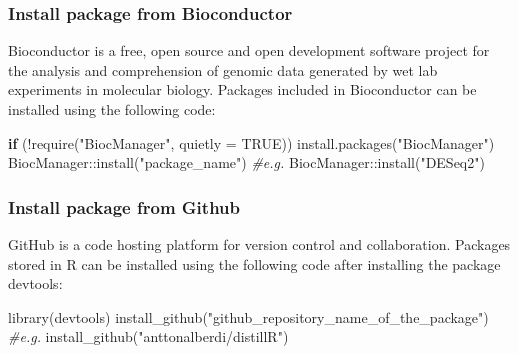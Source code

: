 \documentclass[
]{book}
\newenvironment{Shaded}{\begin{snugshade}}{\end{snugshade}}
\newcommand{\AttributeTok}[1]{\textcolor[rgb]{0.77,0.63,0.00}{#1}}
\newcommand{\CommentTok}[1]{\textcolor[rgb]{0.56,0.35,0.01}{\textit{#1}}}
\newcommand{\ConstantTok}[1]{\textcolor[rgb]{0.00,0.00,0.00}{#1}}
\newcommand{\ControlFlowTok}[1]{\textcolor[rgb]{0.13,0.29,0.53}{\textbf{#1}}}
\newcommand{\FunctionTok}[1]{\textcolor[rgb]{0.00,0.00,0.00}{#1}}
\newcommand{\NormalTok}[1]{#1}
\newcommand{\SpecialCharTok}[1]{\textcolor[rgb]{0.00,0.00,0.00}{#1}}
\newcommand{\StringTok}[1]{\textcolor[rgb]{0.31,0.60,0.02}{#1}}
\begin{document}
\hypertarget{install-package-from-bioconductor}{%
\subsubsection*{Install package from Bioconductor}\label{install-package-from-bioconductor}}

Bioconductor is a free, open source and open development software project for the analysis and comprehension of genomic data generated by wet lab experiments in molecular biology. Packages included in Bioconductor can be installed using the following code:

\begin{Shaded}
\begin{Highlighting}[]
\ControlFlowTok{if}\NormalTok{ (}\SpecialCharTok{!}\FunctionTok{require}\NormalTok{(}\StringTok{"BiocManager"}\NormalTok{, }\AttributeTok{quietly =} \ConstantTok{TRUE}\NormalTok{))}
    \FunctionTok{install.packages}\NormalTok{(}\StringTok{"BiocManager"}\NormalTok{)}
\NormalTok{BiocManager}\SpecialCharTok{::}\FunctionTok{install}\NormalTok{(}\StringTok{"package\_name"}\NormalTok{)}
\CommentTok{\#e.g.}
\NormalTok{BiocManager}\SpecialCharTok{::}\FunctionTok{install}\NormalTok{(}\StringTok{"DESeq2"}\NormalTok{)}
\end{Highlighting}
\end{Shaded}

\hypertarget{install-package-from-github}{%
\subsubsection*{Install package from Github}\label{install-package-from-github}}

GitHub is a code hosting platform for version control and collaboration. Packages stored in R can be installed using the following code after installing the package devtools:

\begin{Shaded}
\begin{Highlighting}[]
\FunctionTok{library}\NormalTok{(devtools)}
\FunctionTok{install\_github}\NormalTok{(}\StringTok{"github\_repository\_name\_of\_the\_package"}\NormalTok{)}
\CommentTok{\#e.g.}
\FunctionTok{install\_github}\NormalTok{(}\StringTok{"anttonalberdi/distillR"}\NormalTok{)}
\end{Highlighting}
\end{Shaded}
\end{document}
